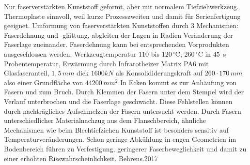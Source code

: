 Nur faserverstärkten Kunststoff geformt, aber mit normalem Tiefziehwerkzeug.
Thermoplaste sinnvoll, weil kurze Prozesszweiten und damit für Serienfertigung geeignet.
Umformung von faserverstärkten Kunststoffen durch 3 Mechanismen: Faserdehnung und -glättung, abgleiten der Lagen in Radien Veränderung der Faserlage zueinander.
Faserdehnung kann bei entsprechenden Vorprodukten ausgeschlossen werden.
Werkzeugtemperatur $110$ bis $120 \, ^\circ \text{C}$, $260 \, ^\circ \text{C}$ in $45\,$ s Probentemperatur, Erwärmung durch Infrarotheizer
Matrix PA6 mit Glasfaseranteil, $1,5\, mm$ dick
$1600 kN$ als Konsolididerungskraft auf $260 \cdot 170 \, mm$ also einer Grundfläche von $44200 \, mm^2$
In Ecken kommt es zur Anhäufung von Fasern und zum Bruch.
Durch Klemmen der Fasern unter dem Stempel wird der Verlauf unterbrochen und die Faserlage geschwächt.
Diese Fehlstellen können durch nachträgliches Aufschmelzen der Fasern untersucht werden.
Durch Fasern unterschiedlicher Materialnachzug aus dem Flanschbereich, ähnliche Mechanismen wie beim Blechtiefziehen
Kunststoff ist besonders sensitiv auf Temperaturveränderungen.
Schon geringe Abkühlung in engen Geometrien im Bodenbereich führen zu Verfestigung, geringerer Faserbeweglichkeit und damit zu einer erhöhten Risswahrscheinlichkeit.
Behrens.2017

